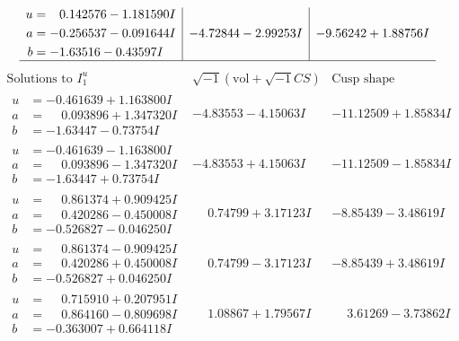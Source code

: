 \documentclass[1p]{elsarticle_modified}
\theoremstyle{definition}
\newcommand{\I}{\sqrt{-1}}
\begin{document}
$$\begin{array}{c|c|c}
\begin{aligned}
u &= \phantom{-}0.142576 - 1.181590 I \\
a &= -0.256537 - 0.091644 I \\
b &= -1.63516 - 0.43597 I\end{aligned}
 & -4.72844 - 2.99253 I & -9.56242 + 1.88756 I\\
 \hline 
 \end{array}$$\newpage$$\begin{array}{c|c|c}  
\text{Solutions to }I^u_{1}& \I (\text{vol} + \sqrt{-1}CS) & \text{Cusp shape}\\
 \hline 
\begin{aligned}
u &= -0.461639 + 1.163800 I \\
a &= \phantom{-}0.093896 + 1.347320 I \\
b &= -1.63447 - 0.73754 I\end{aligned}
 & -4.83553 - 4.15063 I & -11.12509 + 1.85834 I \\ \hline\begin{aligned}
u &= -0.461639 - 1.163800 I \\
a &= \phantom{-}0.093896 - 1.347320 I \\
b &= -1.63447 + 0.73754 I\end{aligned}
 & -4.83553 + 4.15063 I & -11.12509 - 1.85834 I \\ \hline\begin{aligned}
u &= \phantom{-}0.861374 + 0.909425 I \\
a &= \phantom{-}0.420286 - 0.450008 I \\
b &= -0.526827 - 0.046250 I\end{aligned}
 & \phantom{-}0.74799 + 3.17123 I & -8.85439 - 3.48619 I \\ \hline\begin{aligned}
u &= \phantom{-}0.861374 - 0.909425 I \\
a &= \phantom{-}0.420286 + 0.450008 I \\
b &= -0.526827 + 0.046250 I\end{aligned}
 & \phantom{-}0.74799 - 3.17123 I & -8.85439 + 3.48619 I \\ \hline\begin{aligned}
u &= \phantom{-}0.715910 + 0.207951 I \\
a &= \phantom{-}0.864160 - 0.809698 I \\
b &= -0.363007 + 0.664118 I\end{aligned}
 & \phantom{-}1.08867 + 1.79567 I & \phantom{-}3.61269 - 3.73862 I \\ \hline\begin{aligned}

\end{aligned}
\end{array}$$
\end{document}
